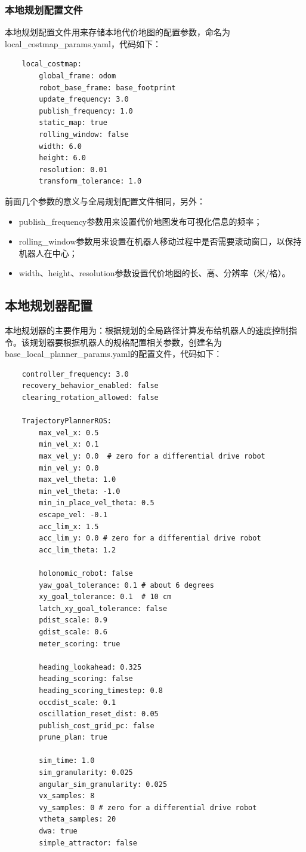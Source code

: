 \documentclass[9pt, oneside]{book}
\begin{document}
\subsubsection{本地规划配置文件}

本地规划配置文件用来存储本地代价地图的配置参数，命名为local\_costmap\_params.yaml，代码如下：

\begin{verbatim}
    local_costmap:
        global_frame: odom
        robot_base_frame: base_footprint
        update_frequency: 3.0
        publish_frequency: 1.0
        static_map: true
        rolling_window: false
        width: 6.0
        height: 6.0
        resolution: 0.01
        transform_tolerance: 1.0
\end{verbatim}

前面几个参数的意义与全局规划配置文件相同，另外：

\begin{itemize}
    \item publish\_frequency参数用来设置代价地图发布可视化信息的频率；
    \item rolling\_window参数用来设置在机器人移动过程中是否需要滚动窗口，以保持机器人在中心；
    \item width、height、resolution参数设置代价地图的长、高、分辨率（米/格）。
\end{itemize}

\subsection{本地规划器配置}

本地规划器的主要作用为：根据规划的全局路径计算发布给机器人的速度控制指令。该规划器要根据机器人的规格配置相关参数，创建名为base\_local\_planner\_params.yaml的配置文件，代码如下：

\begin{verbatim}
    controller_frequency: 3.0
    recovery_behavior_enabled: false
    clearing_rotation_allowed: false

    TrajectoryPlannerROS:
        max_vel_x: 0.5
        min_vel_x: 0.1
        max_vel_y: 0.0  # zero for a differential drive robot
        min_vel_y: 0.0
        max_vel_theta: 1.0
        min_vel_theta: -1.0
        min_in_place_vel_theta: 0.5
        escape_vel: -0.1
        acc_lim_x: 1.5
        acc_lim_y: 0.0 # zero for a differential drive robot
        acc_lim_theta: 1.2

        holonomic_robot: false
        yaw_goal_tolerance: 0.1 # about 6 degrees
        xy_goal_tolerance: 0.1  # 10 cm
        latch_xy_goal_tolerance: false
        pdist_scale: 0.9
        gdist_scale: 0.6
        meter_scoring: true

        heading_lookahead: 0.325
        heading_scoring: false
        heading_scoring_timestep: 0.8
        occdist_scale: 0.1
        oscillation_reset_dist: 0.05
        publish_cost_grid_pc: false
        prune_plan: true

        sim_time: 1.0
        sim_granularity: 0.025
        angular_sim_granularity: 0.025
        vx_samples: 8
        vy_samples: 0 # zero for a differential drive robot
        vtheta_samples: 20
        dwa: true
        simple_attractor: false
\end{verbatim}
\end{document}
